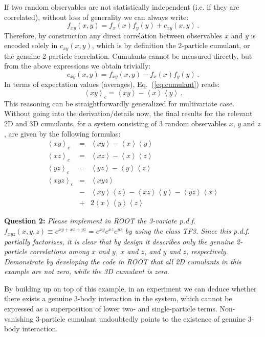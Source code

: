 \documentclass[11pt]{article}
\begin{document}
If two random observables are not statistically independent (i.e. if they are correlated), without loss of generality we can always write:
%
\begin{equation}
f_{xy}(x,y) = f_{x}(x)f_{y}(y) + c_{xy}(x,y)\,.
\end{equation}
%
Therefore, by construction any direct correlation between observables $x$ and $y$ is encoded solely in $c_{xy}(x,y)$, which is by definition the 2-particle cumulant, or the genuine 2-particle correlation. Cumulants cannot be measured directly, but from the above expressions we obtain trivially:
%
\begin{equation}
c_{xy}(x,y) = f_{xy}(x,y) - f_{x}(x)f_{y}(y)\,.
\label{eq:cumulant}
\end{equation}
%
In terms of expectation values (averages), Eq.~(\ref{eq:cumulant}) reads:
%
\begin{equation}
\left<xy\right>_c = \left<xy\right> - \left<x\right>\left<y\right>\,.
\label{eq:cumulant:averages}
\end{equation}
%
This reasoning can be straightforwardly generalized for multivariate case. Without going into the derivation/details now, the final results for the relevant 2D and 3D cumulants, for a system consisting of 3 random observables $x$, $y$ and $z$, are given by the following formulas:
%
\begin{eqnarray}
\left<xy\right>_c&=&\left<xy\right> - \left<x\right>\left<y\right>\nonumber\\
\left<xz\right>_c&=&\left<xz\right> - \left<x\right>\left<z\right>\nonumber\\
\left<yz\right>_c&=&\left<yz\right> - \left<y\right>\left<z\right>\nonumber\\
\left<xyz\right>_c&=&\left<xyz\right>\nonumber\\
&-&\left<xy\right>\left<z\right>-\left<xz\right>\left<y\right>-\left<yz\right>\left<x\right>\nonumber\\
&+& 2\left<x\right>\left<y\right>\left<z\right>\nonumber
\end{eqnarray}
%

\bigskip

\noindent\textbf{Question 2:} {\it Please implement in ROOT the 3-variate p.d.f. $f_{xyz}(x,y,z) \equiv e^{xy+xz+yz} =  e^{xy}e^{xz}e^{yz}$ by using the class TF3. Since this p.d.f. partially factorizes, it is clear that by design it describes only the genuine 2-particle correlations among $x$ and $y$, $x$ and $z$, and $y$ and $z$, respectively. Demonstrate by developing the code in ROOT that all 2D cumulants in this example are not zero, while the 3D cumulant is zero.} 

\bigskip

\noindent By building up on top of this example, in an experiment we can deduce whether there exists a genuine 3-body interaction in the system, which cannot be expressed as a superposition of lower two- and single-particle terms. Non-vanishing 3-particle cumulant undoubtedly points to the existence of genuine 3-body interaction.  
\end{document}
